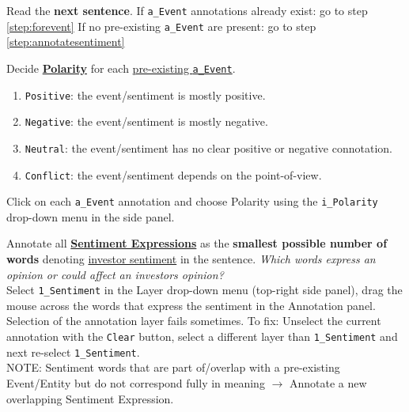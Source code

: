 \begin{steps}[leftmargin=*]
    
    \item \label{step:start} Read the \textbf{next sentence}.
    If \eventcolor \texttt{a\_Event} annotations already exist: go to step \ref{step:forevent}
    If no pre-existing \texttt{a\_Event} are present: go to step \ref{step:annotatesentiment}
    
    \item \label{step:forevent} Decide \hyperlink{sec:polaritydefinition}{\textbf{Polarity}} for each \hyperlink{sec:eventdefinition}{pre-existing \texttt{a\_Event}}.
    \begin{enumerate}[label=\alph*), leftmargin=*] \label{step:polarity}%
        \item \texttt{Positive}: the event/sentiment is mostly positive.
        \item \texttt{Negative}: the event/sentiment is mostly negative.
        \item \texttt{Neutral}: the event/sentiment has no clear positive or negative connotation.
        \item \texttt{Conflict}: the event/sentiment depends on the point-of-view.
    \end{enumerate}
    \textcolor{OliveGreen}{Click on each \eventcolor \texttt{a\_Event} annotation and choose Polarity using the \texttt{i\_Polarity} drop-down menu in the side panel.}
    
    \item \label{step:annotatesentiment} Annotate all \hyperlink{sec:sentimentexpressiondefinition}{\textbf{Sentiment Expressions}} as the \textbf{smallest possible number of words} denoting \hyperlink{sec:sentimentdef}{investor sentiment} in the sentence. %
    \textit{Which words express an opinion or could affect an investors opinion?}\\
    \textcolor{OliveGreen}{Select \texttt{1\_Sentiment} in the Layer drop-down menu (top-right side panel), drag the mouse across the words that express the sentiment in the Annotation panel. \footnotesize{Selection of the annotation layer fails sometimes. To fix: Unselect the current annotation with the \texttt{Clear} button, select a different layer than \texttt{1\_Sentiment} and next re-select \texttt{1\_Sentiment}.}}\\
    \textcolor{BrickRed}{NOTE: Sentiment words that are part of/overlap with a pre-existing Event/Entity but do not correspond fully in meaning $\rightarrow$ Annotate a new overlapping Sentiment Expression.}\\
    

\end{steps}
